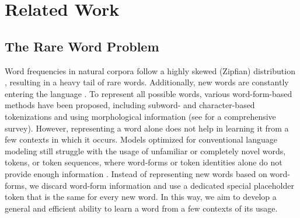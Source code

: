 \section{Related Work}
\label{sec:related-work}

\subsection{The Rare Word Problem}
Word frequencies in natural corpora follow a highly skewed (Zipfian) distribution \citep{Zipf1949HumanBA}, resulting in a heavy tail of rare words. Additionally, new words are constantly entering the language \citep{Heaps1978InformationRC}.
To represent all possible words, various word-form-based methods have been proposed, including subword- and character-based tokenizations and using morphological information (see \citealp{Mielke2021BetweenWA} for a comprehensive survey).
However, representing a word alone does not help in learning it from a few contexts in which it occurs.
Models optimized for conventional language modeling still struggle with the usage of unfamiliar or completely novel words, tokens, or token sequences, where word-forms or token identities alone do not provide enough information \citep{Ott2018AnalyzingUI,Schick2020RareWA,wei-etal-2021-frequency,Razeghi2022ImpactOP,Kim2022UncontrolledLE,Batsuren2024EvaluatingST,Land2024FishingFM}.
Instead of representing new words based on word-forms, we discard word-form information and use a dedicated special placeholder token that is the same for every new word. In this way, we aim to develop a general and efficient ability to learn a word from a few contexts of its usage.

